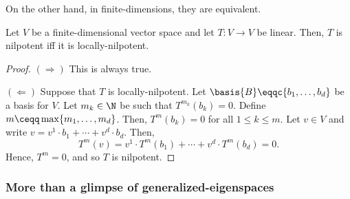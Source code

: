 On the other hand, in finite-dimensions, they are equivalent.
\begin{prp}{}{}
	Let $V$ be a finite-dimensional vector space and let $T\colon V\rightarrow V$ be linear.  Then, $T$ is nilpotent iff it is locally-nilpotent.
	\begin{proof}
		$(\Rightarrow )$ This is always true.
		
		\blni
		$(\Leftarrow )$ Suppose that $T$ is locally-nilpotent.  Let $\basis{B}\eqqc \{ b_1,\ldots ,b_d\}$ be a basis for $V$.  Let $m_k\in \N$ be such that $T^{m_k}(b_k)=0$.  Define $m\ceqq \max \{ m_1,\ldots ,m_d\}$.  Then, $T^m(b_k)=0$ for all $1\leq k\leq m$.  Let $v\in V$ and write $v=v^1\cdot b_1+\cdots +v^d\cdot b_d$.  Then,
		\begin{equation}
			T^m(v)=v^1\cdot T^m(b_1)+\cdots +v^d\cdot T^m(b_d)=0.
		\end{equation}
		Hence, $T^m=0$, and so $T$ is nilpotent.
	\end{proof}
\end{prp}

\subsubsection{More than a glimpse of generalized-eigenspaces}

